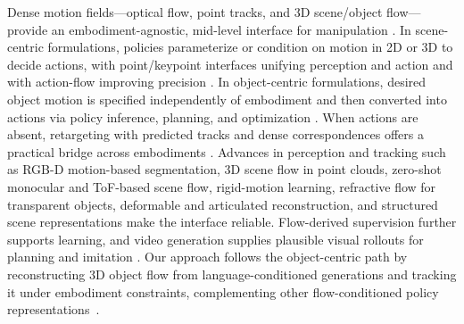 Dense motion fields—optical flow, point tracks, and 3D scene/object flow—provide an embodiment-agnostic, mid-level interface for manipulation \cite{xu2025flow,yuan2025general}. In scene-centric formulations, policies parameterize or condition on motion in 2D or 3D to decide actions, with point/keypoint interfaces unifying perception and action and with action-flow improving precision \cite{weng2021fabricflownet,goyal2022ifor,seita2023toolflownet,chen2024g3flow,wang2025skil,haldar2025point,guo2025actionsink}. In object-centric formulations, desired object motion is specified independently of embodiment and then converted into actions via policy inference, planning, and optimization \cite{eisner2022flowbot3d,gao2024flip,guo2025flowdreamer,zhi2025flowaction,he2025manitrend,yin2025object}. When actions are absent, retargeting with predicted tracks and dense correspondences offers a practical bridge across embodiments \cite{bharadhwaj2024track2act,ko2023learning,chen2025ecflow}. Advances in perception and tracking such as RGB-D motion-based segmentation, 3D scene flow in point clouds, zero-shot monocular and ToF-based scene flow, rigid-motion learning, refractive flow for transparent objects, deformable and articulated reconstruction, and structured scene representations \cite{shao2018motionseg,liu2018flownet3d,liang2025zeroshotmsf,nvidia2025zeromsf,sander2025tofsceneflow,byravan2016se3nets,tang2023rftrans,duisterhof2024deformgs,kerr2024rsrd,jiang2024roboexp,shorinwa2024splatmover} make the interface reliable. Flow-derived supervision further supports learning, and video generation supplies plausible visual rollouts for planning and imitation \cite{guzey2025bridging,yu2025genflowrl,bharadhwaj2024gen2act,patel2025rigvid}. Our approach follows the object-centric path by reconstructing 3D object flow from language-conditioned generations and tracking it under embodiment constraints, complementing other flow-conditioned policy representations~\cite{weng2021fabricflownet,seita2023toolflownet,eisner2022flowbot3d,gao2024flip,guo2025flowdreamer}.

